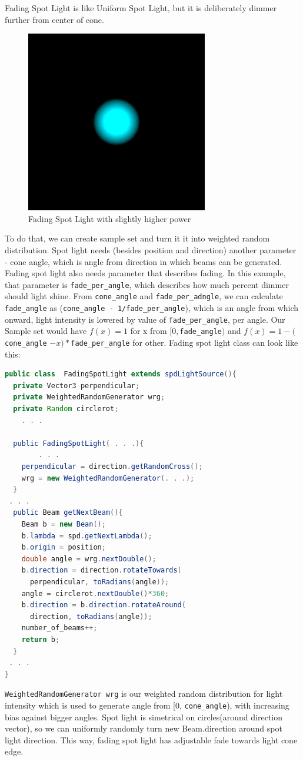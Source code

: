 \documentclass[12pt, letterpaper]{article}
\begin{document}
Fading Spot Light is like Uniform Spot Light, but it is deliberately dimmer further from center of cone.
\begin{figure}[H]
\centering 
\includegraphics[scale=0.5]{FSL.png}
\caption{Fading Spot Light with slightly higher power}
\end{figure}
To do that, we can create sample set and turn it it into weighted random distribution. Spot light needs (besides position and direction) another parameter - cone angle, which is angle from direction in which beams can be generated. Fading spot light also needs parameter that describes fading. In this example, that parameter is \verb|fade_per_angle|, which describes how much percent dimmer should light shine. From \verb|cone_angle| and \verb|fade_per_adngle|, we can calculate \verb|fade_angle| as (\verb|cone_angle - 1/fade_per_angle|), which is an angle from which onward, light intensity is lowered by value of \verb|fade_per_angle|, per angle. Our Sample set would have $f(x) = 1$ for x from $[0,$\verb|fade_angle|$)$ and $f(x) = 1 - ($\verb|cone_angle| $- x)*$\verb|fade_per_angle| for other. Fading spot light class can look like this:
\begin{lstlisting}[language=Java]
public class  FadingSpotLight extends spdLightSource(){
  private Vector3 perpendicular;
  private WeightedRandomGenerator wrg; 
  private Random circlerot;
 	. . .

  public FadingSpotLight( . . .){
		. . .
	perpendicular = direction.getRandomCross();
	wrg = new WeightedRandomGenerator(. . .);
  }
 . . .
  public Beam getNextBeam(){
	Beam b = new Bean();
	b.lambda = spd.getNextLambda();
	b.origin = position;
	double angle = wrg.nextDouble();
	b.direction = direction.rotateTowards(
	  perpendicular, toRadians(angle));
	angle = circlerot.nextDouble()*360;
	b.direction = b.direction.rotateAround(
	  direction, toRadians(angle)); 
	number_of_beams++;
	return b;
  }
 . . .
}
\end{lstlisting}
\verb|WeightedRandomGenerator wrg| is our weighted random distribution for light intensity which is used to generate angle from [0, \verb|cone_angle|), with increasing bias against bigger angles. Spot light is simetrical on circles(around direction vector), so we can uniformly randomly turn new Beam.direction around spot light direction. This way, fading spot light has adjustable fade towards light cone edge.
 
\end{document}

